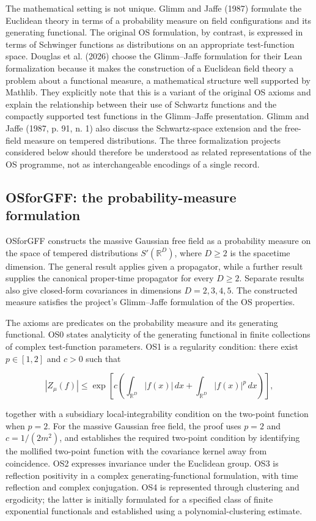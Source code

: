 \documentclass[pdflatex,sn-apa]{sn-jnl}
\begin{document}
The mathematical setting is not unique. Glimm and Jaffe (1987) formulate the Euclidean theory in terms of a probability measure on field configurations and its generating functional. The original OS formulation, by contrast, is expressed in terms of Schwinger functions as distributions on an appropriate test-function space. Douglas et al. (2026) choose the Glimm--Jaffe formulation for their Lean formalization because it makes the construction of a Euclidean field theory a problem about a functional measure, a mathematical structure well supported by Mathlib. They explicitly note that this is a variant of the original OS axioms and explain the relationship between their use of Schwartz functions and the compactly supported test functions in the Glimm--Jaffe presentation. Glimm and Jaffe (1987, p. 91, n. 1) also discuss the Schwartz-space extension and the free-field measure on tempered distributions. The three formalization projects considered below should therefore be understood as related representations of the OS programme, not as interchangeable encodings of a single record.

\subsection{OSforGFF: the probability-measure formulation}

OSforGFF constructs the massive Gaussian free field as a probability measure on the space of tempered distributions \(S'(\mathbb R^D)\), where \(D\geq2\) is the spacetime dimension. The general result applies given a propagator, while a further result supplies the canonical proper-time propagator for every \(D\geq2\). Separate results also give closed-form covariances in dimensions \(D=2,3,4,5\). The constructed measure satisfies the project's Glimm--Jaffe formulation of the OS properties.

The axioms are predicates on the probability measure and its generating functional. OS0 states analyticity of the generating functional in finite collections of complex test-function parameters. OS1 is a regularity condition: there exist \(p\in[1,2]\) and \(c>0\) such that

\[
|Z_\mu(f)| \leq
\exp\left[
c\left(
\int_{\mathbb R^D}|f(x)|\,dx+
\int_{\mathbb R^D}|f(x)|^p\,dx
\right)
\right],
\]

together with a subsidiary local-integrability condition on the two-point function when \(p=2\). For the massive Gaussian free field, the proof uses \(p=2\) and \(c=1/(2m^2)\), and establishes the required two-point condition by identifying the mollified two-point function with the covariance kernel away from coincidence. OS2 expresses invariance under the Euclidean group. OS3 is reflection positivity in a complex generating-functional formulation, with time reflection and complex conjugation. OS4 is represented through clustering and ergodicity; the latter is initially formulated for a specified class of finite exponential functionals and established using a polynomial-clustering estimate.
\end{document}
